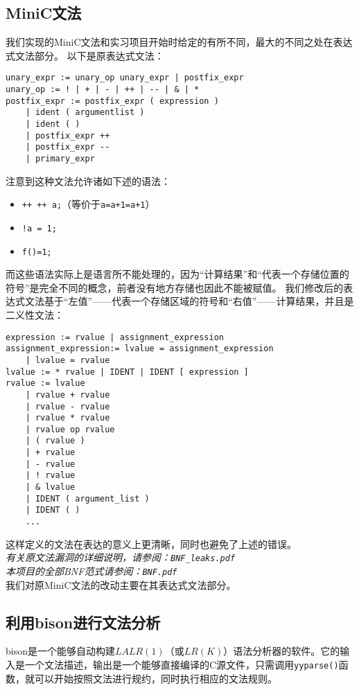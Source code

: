 \subsection{MiniC文法}
我们实现的MiniC文法和实习项目开始时给定的有所不同，最大的不同之处在表达式文法部分。
以下是原表达式文法：
\begin{verbatim}
unary_expr := unary_op unary_expr | postfix_expr
unary_op := ! | + | - | ++ | -- | & | *
postfix_expr := postfix_expr ( expression )
	| ident ( argumentlist )
	| ident ( )
	| postfix_expr ++
	| postfix_expr --
	| primary_expr
\end{verbatim}
注意到这种文法允许诸如下述的语法：
\begin{itemize}
	\item \verb|++ ++ a;|（等价于\verb|a=a+1=a+1|）
	\item \verb|!a = 1;|
	\item \verb|f()=1;|
\end{itemize}
而这些语法实际上是语言所不能处理的，因为“计算结果”和“代表一个存储位置的符号”是完全不同的概念，前者没有地方存储也因此不能被赋值。
\label{lrvalue}
我们修改后的表达式文法基于“左值”——代表一个存储区域的符号和“右值”——计算结果，并且是二义性文法：
\begin{verbatim}
expression := rvalue | assignment_expression
assignment_expression:= lvalue = assignment_expression 
	| lvalue = rvalue
lvalue := * rvalue | IDENT | IDENT [ expression ]
rvalue := lvalue
	| rvalue + rvalue
	| rvalue - rvalue
	| rvalue * rvalue
	| rvalue op rvalue
	| ( rvalue )
	| + rvalue
	| - rvalue
	| ! rvalue
	| & lvalue
	| IDENT ( argument_list )
	| IDENT ( )
	...
\end{verbatim}
这样定义的文法在表达的意义上更清晰，同时也避免了上述的错误。\\
{\it \anchor 有关原文法漏洞的详细说明，请参阅：\verb|BNF_leaks.pdf|}\\
{\it \anchor 本项目的全部BNF范式请参阅：\verb|BNF.pdf|}\\

我们对原MiniC文法的改动主要在其表达式文法部分。

\subsection{利用bison进行文法分析}
bison是一个能够自动构建$LALR(1)$（或$LR(K)$）语法分析器的软件。它的输入是一个文法描述，输出是一个能够直接编译的C源文件，只需调用\verb|yyparse()|函数，就可以开始按照文法进行规约，同时执行相应的文法规则。

